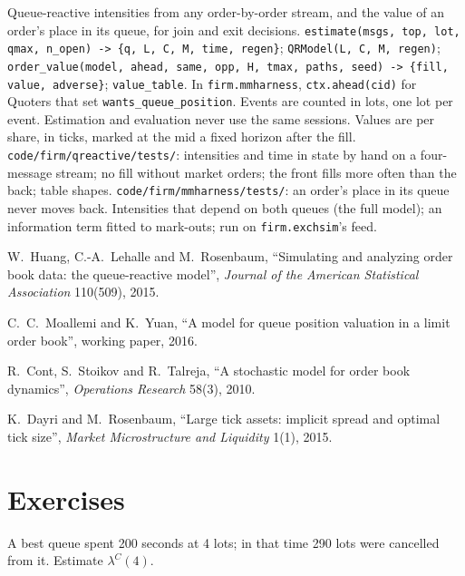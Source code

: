 \begin{build}
 Queue-reactive intensities from any order-by-order stream, and the value of an order's place in its queue, for join and exit
decisions.
 \texttt{estimate(msgs, top, lot, qmax, n\_open) -> \{q, L, C, M, time, regen\}}; \texttt{QRModel(L, C, M, regen)};
\texttt{order\_value(model, ahead, same, opp, H, tmax, paths, seed) -> \{fill, value, adverse\}}; \texttt{value\_table}. In
\texttt{firm.mmharness}, \texttt{ctx.ahead(cid)} for Quoters that set \texttt{wants\_queue\_position}.
 Events are counted in lots, one lot per event. Estimation and evaluation never use the same sessions. Values are per share, in
ticks, marked at the mid a fixed horizon after the fill.
 \texttt{code/firm/qreactive/tests/}: intensities and time in state by hand on a four-message stream; no fill without market
orders; the front fills more often than the back; table shapes. \texttt{code/firm/mmharness/tests/}: an order's place in its queue never moves back.
 Intensities that depend on both queues (the full model); an information term fitted to mark-outs; run on \texttt{firm.exchsim}'s
feed.
\end{build}

\begin{omsources}
\item W.~Huang, C.-A.~Lehalle and M.~Rosenbaum, ``Simulating and analyzing order book data: the queue-reactive model'', \emph{Journal of the American
Statistical Association} 110(509), 2015.
\item C.~C.~Moallemi and K.~Yuan, ``A model for queue position valuation in a limit order book'', working paper, 2016.
\item R.~Cont, S.~Stoikov and R.~Talreja, ``A stochastic model for order book dynamics'', \emph{Operations Research} 58(3), 2010.
\item K.~Dayri and M.~Rosenbaum, ``Large tick assets: implicit spread and optimal tick size'', \emph{Market Microstructure and Liquidity} 1(1), 2015.
\end{omsources}

\section{Exercises}

\begin{exercise}[$\star$]\label{exo:hf:queue-reactive-models-and-large-tick-assets:1}
A best queue spent 200 seconds at 4 lots; in that time 290 lots were cancelled from it. Estimate $\lambda^C(4)$.
\end{exercise}

